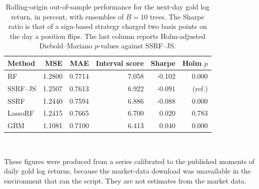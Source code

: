 \begin{table}[htbp]
\centering
\caption{Rolling-origin out-of-sample performance for the next-day gold log return, in percent, with ensembles of $B=10$ trees. The Sharpe ratio is that of a sign-based strategy charged two basis points on the day a position flips. The last column reports Holm-adjusted Diebold--Mariano $p$-values against SSRF--JS.}
\label{tab:gold_B10}
\small
\setlength{\tabcolsep}{5pt}
\begin{tabular}{lrrrrr}
\toprule
Method & MSE & MAE & Interval score & Sharpe & Holm $p$ \\
\midrule
RF & 1.2800 & 0.7714 & 7.058 & -0.102 & 0.000 \\
SSRF--JS & 1.2507 & 0.7613 & 6.922 & -0.091 & (ref.) \\
SSRF & 1.2440 & 0.7594 & 6.886 & -0.088 & 0.000 \\
LassoRF & 1.2415 & 0.7665 & 6.700 & 0.020 & 0.783 \\
GBM & 1.1081 & 0.7100 & 6.413 & 0.040 & 0.000 \\
\bottomrule
\end{tabular}
\\[2pt]
\parbox{\textwidth}{\footnotesize These figures were produced from a series calibrated to the published moments of daily gold log returns, because the market-data download was unavailable in the environment that ran the script. They are not estimates from the market data.}
\end{table}

